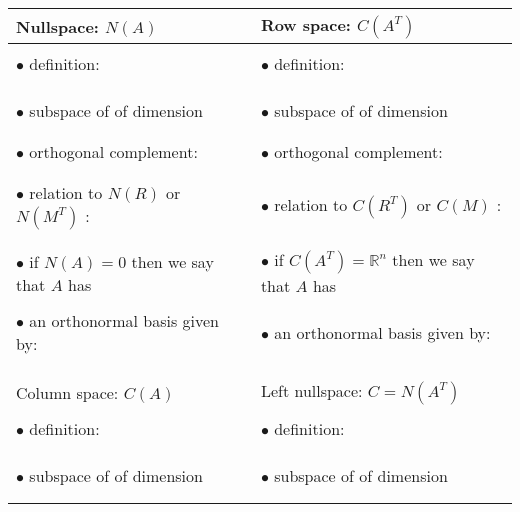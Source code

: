 \documentclass[11pt]{article}
\newcommand{\rr}{\mathbb{R}}
\begin{document}
\begin{tabular}{ l | l }
Nullspace: $N(A)$ & Row space: $C(A^T)$  \\[5pt] \hline \\
$\bullet$ definition: & $\bullet$ definition: \\ \\ \\ \\
$\bullet$ subspace of \underline{\phantom{aaaaaaaaa}} of dimension \underline{\phantom{aaaaa}} \phantom{aaaaaaa} & $\bullet$ subspace of \underline{\phantom{aaaaaaaaa}} of dimension \underline{\phantom{aaaaa}} \phantom{aaaaaaa} \\ \\ \\
$\bullet$ orthogonal complement: & $\bullet$ orthogonal complement: \\ \\ \\
$\bullet$ relation to $N(R)$ or $N(M^T)$ : & $\bullet$ relation to $C(R^T)$ or $C(M)$ : \\ \\ \\
\makecell[l]{$\bullet$ if $N(A) = 0$ then we say that $A$ has\\ \\ \qquad  \underline{\phantom{aaaaaaaaaaaaaaaaaaaaaaaaaaaaaaaaa}}} & \makecell[l]{$\bullet$ if $C(A^T) = \rr^n$ then we say that $A$ has\\ \\ \qquad  \underline{\phantom{aaaaaaaaaaaaaaaaaaaaaaaaaaaaaaaaa}}} \\ \\
$\bullet$ an orthonormal basis given by: & $\bullet$ an orthonormal basis given by: \\  \\ \\ \hline \hline \\
Column space: $C(A)$ & Left nullspace: $C=N(A^T)$  \\[5pt] \hline \\
$\bullet$ definition: & $\bullet$ definition: \\ \\ \\ \\
$\bullet$ subspace of \underline{\phantom{aaaaaaaaa}} of dimension \underline{\phantom{aaaaa}} \phantom{aaaaaaa} & $\bullet$ subspace of \underline{\phantom{aaaaaaaaa}} of dimension \underline{\phantom{aaaaa}} \phantom{aaaaaaa} \\ \\ \\

\end{tabular}
\end{document}
